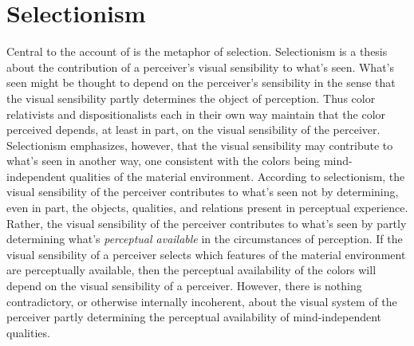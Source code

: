 \documentclass[12pt]{article}
\begin{document}
\section{Selectionism}\label{sec:selectionism} 

Central to the account of \cite{Hilbert:2000on} is the metaphor of selection. Selectionism is a thesis about the contribution of a perceiver's visual sensibility to what's seen. What's seen might be thought to depend on the perceiver's sensibility in the sense that the visual sensibility partly determines the object of perception. Thus color relativists and dispositionalists each in their own way maintain that the color perceived depends, at least in part, on the visual sensibility of the perceiver. Selectionism emphasizes, however, that the visual sensibility may contribute to what's seen in another way, one consistent with the colors being mind-independent qualities of the material environment. According to selectionism, the visual sensibility of the perceiver contributes to what's seen not by determining, even in part, the objects, qualities, and relations present in perceptual experience. Rather, the visual sensibility of the perceiver contributes to what's seen by partly determining what's \emph{perceptual available} in the circumstances of perception. If the visual sensibility of a perceiver selects which features of the material environment are perceptually available, then the perceptual availability of the colors will depend on the visual sensibility of a perceiver. However, there is nothing contradictory, or otherwise internally incoherent, about the visual system of the perceiver partly determining the perceptual availability of mind-independent qualities. \citep[See][39--53.]{Price:1932fk}
\end{document}
